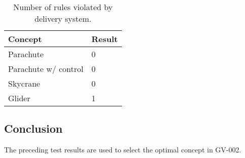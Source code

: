 \documentclass[]{auvsi_doc}
\begin{document}
	\begin{table}[!h]
	\centering

	\caption{Number of rules violated by delivery system.}
	\label{rules}
	\begin{tabular}{|l|l|}
		\hline
		\textbf{Concept}       & \textbf{Result} \\
		\hline
		Parachute              &       0          \\
		Parachute w/ control   &       0         \\
		Skycrane               &            0     \\
		Glider                 &		1		 \\
		\hline
	\end{tabular}
	\end{table}

\subsection{Conclusion}
The preceding test results are used to select the optimal concept in GV-002.
\end{document}
